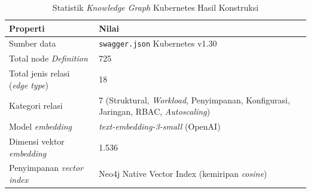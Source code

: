 \renewcommand{\arraystretch}{1.3}
\captionsetup[table]{justification=raggedright,singlelinecheck=false}
\begin{table}[H]
\caption{Statistik \textit{Knowledge Graph} Kubernetes Hasil Konstruksi}
\label{tbl:kg_statistics}
\centering
\begin{tabular}{| p{} | p{} |}
\hline
\textbf{Properti} & \textbf{Nilai} \\
\hline
Sumber data & \texttt{swagger.json} Kubernetes v1.30 \\
\hline
Total node \textit{Definition} & 725 \\
\hline
Total jenis relasi (\textit{edge type}) & 18 \\
\hline
Kategori relasi & 7 (Struktural, \textit{Workload}, Penyimpanan, Konfigurasi, Jaringan, RBAC, \textit{Autoscaling}) \\
\hline
Model \textit{embedding} & \textit{text-embedding-3-small} (OpenAI) \\
\hline
Dimensi vektor \textit{embedding} & 1.536 \\
\hline
Penyimpanan \textit{vector index} & Neo4j Native Vector Index (kemiripan \textit{cosine}) \\
\hline
\end{tabular}
\end{table}
